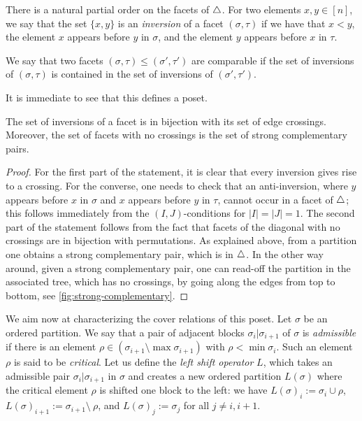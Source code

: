 There is a natural partial order on the facets of $\triangle$. 
For two elements $x,y \in [n]$, we say that the set $\{x,y\}$ is an \emph{inversion} of a facet $(\sigma,\tau)$ if we have that $x<y$, the element $x$ appears before $y$ in $\sigma$, and the element $y$ appears before $x$ in $\tau$. 

\begin{definition}
    We say that two facets $(\sigma,\tau) \leq (\sigma',\tau')$ are comparable if the set of inversions of $(\sigma,\tau)$ is contained in the set of inversions of $(\sigma',\tau')$.
\end{definition}

It is immediate to see that this defines a poset.

\begin{proposition}
\label{p:crossings}
The set of inversions of a facet is in bijection with its set of edge crossings. 
Moreover, the set of facets with no crossings is the set of strong complementary pairs. 
\end{proposition}

\begin{proof}
    For the first part of the statement, it is clear that every inversion gives rise to a crossing. 
    For the converse, one needs to check that an anti-inversion, where $y$ appears before $x$ in $\sigma$ and $x$ appears before $y$ in $\tau$, cannot occur in a facet of $\triangle$; this follows immediately from the $(I,J)$-conditions for $|I|=|J|=1$. 
    The second part of the statement follows from the fact that facets of the diagonal with no crossings are in bijection with permutations.
    As explained above, from a partition one obtains a strong complementary pair, which is in $\triangle$. 
    In the other way around, given a strong complementary pair, one can read-off the partition in the associated tree, which has no crossings, by going along the edges from top to bottom, see \cref{fig:strong-complementary}.
\end{proof}


We aim now at characterizing the cover relations of this poset. 
Let $\sigma$ be an ordered partition.
We say that a pair of adjacent blocks $\sigma_i | \sigma_{i+1}$ of $\sigma$ is \emph{admissible} if there is an element $\rho \in (\sigma_{i+1} \setminus \max\sigma_{i+1})$ with $\rho < \min \sigma_{i}$. 
Such an element $\rho$ is said to be \emph{critical}. 
Let us define the \emph{left shift operator} $L$, which takes an admissible pair $\sigma_i | \sigma_{i+1}$ in $\sigma$ and creates a new ordered partition $L(\sigma)$ where the critical element $\rho$ is shifted one block to the left: we have $L(\sigma)_i := \sigma_i \cup \rho$, $L(\sigma)_{i+1} := \sigma_{i+1} \setminus \ \rho$, and $L(\sigma)_{j}:=\sigma_j$ for all $j\neq i, i+1$. 

